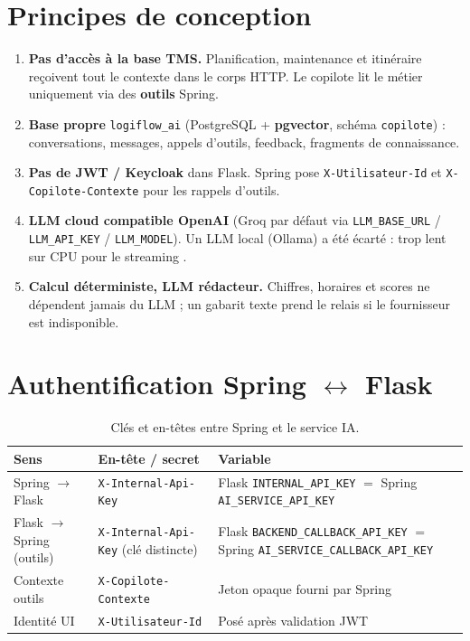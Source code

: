 \section{Principes de conception}

\begin{enumerate}[leftmargin=*]
  \item \textbf{Pas d'accès à la base TMS.} Planification, maintenance et itinéraire reçoivent tout le contexte dans le corps HTTP. Le copilote lit le métier uniquement via des \textbf{outils} Spring.
  \item \textbf{Base propre} \texttt{logiflow\_ai} (PostgreSQL + \textbf{pgvector}, schéma \texttt{copilote}) : conversations, messages, appels d'outils, feedback, fragments de connaissance.
  \item \textbf{Pas de JWT / Keycloak} dans Flask. Spring pose \texttt{X-Utilisateur-Id} et \texttt{X-Copilote-Contexte} pour les rappels d'outils.
  \item \textbf{LLM cloud compatible OpenAI} (Groq par défaut via \texttt{LLM\_BASE\_URL} / \texttt{LLM\_API\_KEY} / \texttt{LLM\_MODEL}). Un LLM local (Ollama) a été écarté : trop lent sur CPU pour le streaming \cite{groq,ollama}.
  \item \textbf{Calcul déterministe, LLM rédacteur.} Chiffres, horaires et scores ne dépendent jamais du LLM ; un gabarit texte prend le relais si le fournisseur est indisponible.
\end{enumerate}

\section{Authentification Spring $\leftrightarrow$ Flask}

\begin{table}[ht]
\centering
\caption{Clés et en-têtes entre Spring et le service IA.}
\label{tab:ia-auth}
\begin{tabularx}{\linewidth}{@{}l X X@{}}
\toprule
Sens & En-tête / secret & Variable \\
\midrule
Spring $\rightarrow$ Flask & \texttt{X-Internal-Api-Key} &
  Flask \texttt{INTERNAL\_API\_KEY} $=$ Spring \texttt{AI\_SERVICE\_API\_KEY} \\
Flask $\rightarrow$ Spring (outils) & \texttt{X-Internal-Api-Key} (clé distincte) &
  Flask \texttt{BACKEND\_CALLBACK\_API\_KEY} $=$ Spring \texttt{AI\_SERVICE\_CALLBACK\_API\_KEY} \\
Contexte outils & \texttt{X-Copilote-Contexte} & Jeton opaque fourni par Spring \\
Identité UI & \texttt{X-Utilisateur-Id} & Posé après validation JWT \\
\bottomrule
\end{tabularx}
\end{table}


